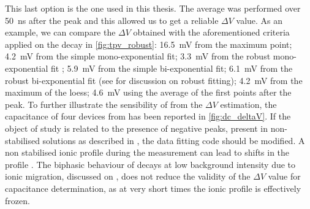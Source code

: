 	This last option is the one used in this thesis.
	The average was performed over \SI{50}{\nano\s} after the peak and this allowed us to get a reliable $\Delta V$ value.
	As an example, we can compare the $\Delta V$ obtained with the aforementioned criteria applied on the  decay in \cref{fig:tpv_robust}: \SI{16.5}{\mV} from the maximum point; \SI{4.2}{\mV} from the simple mono\hyp{}exponential fit; \SI{3.3}{\mV} from the robust mono\hyp{}exponential fit ; \SI{5.9}{\mV} from the simple bi\hyp{}exponential fit; \SI{6.1}{\mV} from the robust bi\hyp{}exponential fit (see  for discussion on robust fitting); \SI{4.2}{\mV} from the maximum of the \gls{loess}; \SI{4.6}{\mV} using the average of the first points after the peak.
	To further illustrate the sensibility of  from the $\Delta V$ estimation, the capacitance of four devices from \cite{Gelmetti2019} has been reported in \cref{fig:dc_deltaV}.
	If the object of study is related to the presence of negative peaks, present in non-stabilised solutions as described in , the data fitting code should be modified.
	A non stabilised ionic profile during the  measurement can lead to shifts in the  profile \cite{ORegan2015b}.
	The biphasic behaviour of  decays at low background intensity due to ionic migration, discussed on , does not reduce the validity of the $\Delta V$ value for capacitance determination, as at very short times the ionic profile is effectively frozen.

